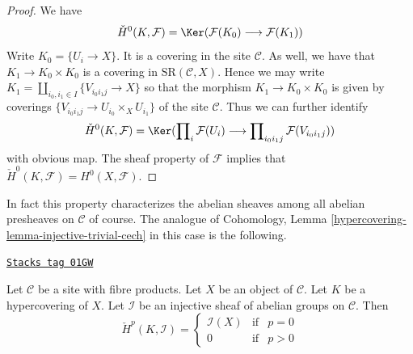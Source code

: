 \begin{proof}
We have
$$
\check{H}^0(K, \mathcal{F})
=
\Ker(\mathcal{F}(K_0) \longrightarrow \mathcal{F}(K_1))
$$
Write $K_0 = \{U_i \to X\}$. It is a covering in the site
$\mathcal{C}$. As well, we have that $K_1 \to K_0 \times K_0$
is a covering in $\text{SR}(\mathcal{C}, X)$. Hence we may
write $K_1 = \amalg_{i_0, i_1 \in I} \{V_{i_0i_1j} \to X\}$
so that the morphism $K_1 \to K_0 \times K_0$ is given
by coverings $\{V_{i_0i_1j} \to U_{i_0} \times_X U_{i_1}\}$
of the site $\mathcal{C}$. Thus we can further identify
$$
\check{H}^0(K, \mathcal{F})
=
\Ker(
\prod\nolimits_i \mathcal{F}(U_i)
\longrightarrow
\prod\nolimits_{i_0i_1 j} \mathcal{F}(V_{i_0i_1j})
)
$$
with obvious map. The sheaf property of $\mathcal{F}$
implies that $\check{H}^0(K, \mathcal{F}) = H^0(X, \mathcal{F})$.
\end{proof}

In fact this property characterizes the abelian sheaves among all
abelian presheaves on $\mathcal{C}$ of course.
The analogue of Cohomology, Lemma \ref{hypercovering-lemma-injective-trivial-cech}
in this case is the following.

\begin{lemma}
\label{hypercovering-lemma-injective-trivial-cech}
\href{https://stacks.math.columbia.edu/tag/01GW}{\texttt{Stacks tag 01GW}}

Let $\mathcal{C}$ be a site with fibre products.
Let $X$ be an object of $\mathcal{C}$.
Let $K$ be a hypercovering of $X$.
Let $\mathcal{I}$ be an injective sheaf of abelian groups on $\mathcal{C}$.
Then
$$
\check{H}^p(K, \mathcal{I}) =
\left\{
\begin{matrix}
\mathcal{I}(X) & \text{if} & p = 0 \\
0 & \text{if} & p > 0
\end{matrix}
\right.
$$
\end{lemma}

